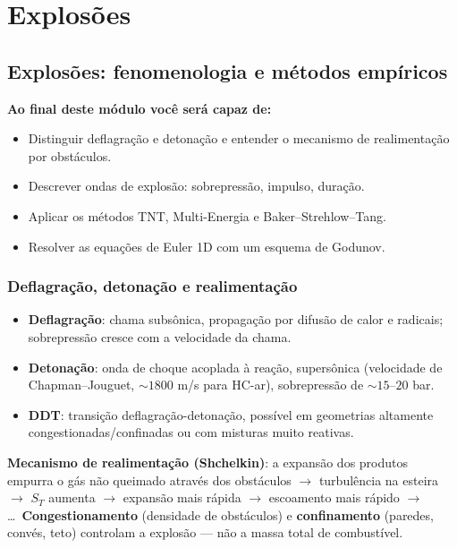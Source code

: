 \documentclass[10pt,a4paper,twocolumn,openany]{report}
\newenvironment{conceito}[1]{\section{#1}}{\par}
\newcommand{\objetivos}{\noindent\textbf{Ao final deste módulo você será capaz de:}}
\begin{document}
\part{Explosões}

\chapter{Explosões: fenomenologia e métodos empíricos}

\objetivos
\begin{itemize}
  \item Distinguir deflagração e detonação e entender o mecanismo de
        realimentação por obstáculos.
  \item Descrever ondas de explosão: sobrepressão, impulso, duração.
  \item Aplicar os métodos TNT, Multi-Energia e Baker--Strehlow--Tang.
  \item Resolver as equações de Euler 1D com um esquema de Godunov.
\end{itemize}

\begin{conceito}{Deflagração, detonação e realimentação}
\begin{itemize}
  \item \textbf{Deflagração}: chama subsônica, propagação por difusão de
        calor e radicais; sobrepressão cresce com a velocidade da chama.
  \item \textbf{Detonação}: onda de choque acoplada à reação, supersônica
        (velocidade de Chapman--Jouguet, $\sim1800$ m/s para HC-ar),
        sobrepressão de $\sim15$--$20$ bar.
  \item \textbf{DDT}: transição deflagração-detonação, possível em geometrias
        altamente congestionadas/confinadas ou com misturas muito reativas.
\end{itemize}
\textbf{Mecanismo de realimentação (Shchelkin)}: a expansão dos produtos
empurra o gás não queimado através dos obstáculos $\rightarrow$ turbulência na
esteira $\rightarrow$ $S_T$ aumenta $\rightarrow$ expansão mais rápida
$\rightarrow$ escoamento mais rápido $\rightarrow$\ldots\ \textbf{Congestionamento}
(densidade de obstáculos) e \textbf{confinamento} (paredes, convés, teto)
controlam a explosão --- não a massa total de combustível.
\end{conceito}
\end{document}
